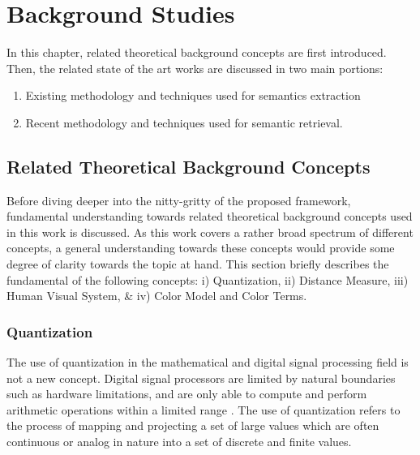 


\chapter{Background Studies}
\label{section:litreview}

In this chapter, related theoretical background concepts are first introduced. Then, the related state of the art works are discussed in two main portions: 
\begin{enumerate}
    \item Existing methodology and techniques used for semantics extraction
    \item Recent methodology and techniques used for semantic retrieval.
\end{enumerate}



\section{Related Theoretical Background Concepts}
\label{subsec:relatedConcepts}

Before diving deeper into the nitty-gritty of the proposed framework, fundamental understanding towards related theoretical background concepts used in this work is discussed. As this work covers a rather broad spectrum of different concepts, a general understanding towards these concepts would provide some degree of clarity towards the topic at hand. This section briefly describes the fundamental of the following concepts: i) Quantization, ii) Distance Measure, iii) Human Visual System, \& iv) Color Model and Color Terms. 


\subsection{Quantization}

The use of quantization in the mathematical and digital signal processing field is not a new concept. Digital signal processors are limited by natural boundaries such as hardware limitations, and are only able to compute and perform arithmetic operations within a limited range \cite{spors_2018}. The use of quantization refers to the process of mapping and projecting a set of large values which are often continuous or analog in nature into a set of discrete and finite values. 

